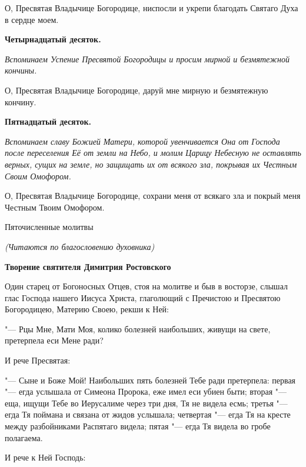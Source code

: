 \normalfont{}О, Пресвятая Владычице Богородице, ниспосли и укрепи благодать Святаго Духа в сердце моем.


\medskip


\bfseries Четырнадцатый десяток.\normalfont{}\nopagebreak


\itshape Вспоминаем Успение Пресвятой Богородицы и просим мирной и безмятежной кончины.

\normalfont{}О, Пресвятая Владычице Богородице, даруй мне мирную и безмятежную кончину.


\medskip


\bfseries Пятнадцатый десяток.\normalfont{}\nopagebreak


\itshape Вспоминаем славу Божией Матери, которой увенчивается Она от Господа после переселения Её от земли на Небо, и молим Царицу Небесную не оставлять верных, сущих на земле, но защищать их от всякого зла, покрывая их Честным Своим Омофором.

\normalfont{}О, Пресвятая Владычице Богородице, сохрани меня от всякаго зла и покрый меня Честным Твоим Омофором.
\nopagebreak\bigskip\bigskip\mychapterending

 

Пяточисленные молитвы 

\itshape (Читаются по благословению духовника)\normalfont{}


\medskip


\bfseries Творение святителя Димитрия Ростовского\normalfont{}\nopagebreak


Один старец от Богоносных Отцев, стоя на молитве и быв в восторзе, слышал глас Господа нашего Иисуса Христа, глаголющий с Пречистою и Пресвятою Богородицею, Материю Своею, рекши к Ней: 


"--- Рцы Мне, Мати Моя, колико болезней наибольших, живущи на свете, претерпела еси Мене ради?


И рече Пресвятая:


"--- Сыне и Боже Мой! Наибольших пять болезней Тебе ради претерпела: первая "--- егда услышала от Симеона Пророка, еже имел еси убиен быти; вторая "--- еща, ищущи Тебе во Иерусалиме через три дня, Тя не видела есмь; третья "--- егда Тя поймана и связана от жидов услышала; четвертая "--- егда Тя на кресте между разбойниками Распятаго видела; пятая "--- егда Тя видела во гробе полагаема.


И рече к Ней Господь:


